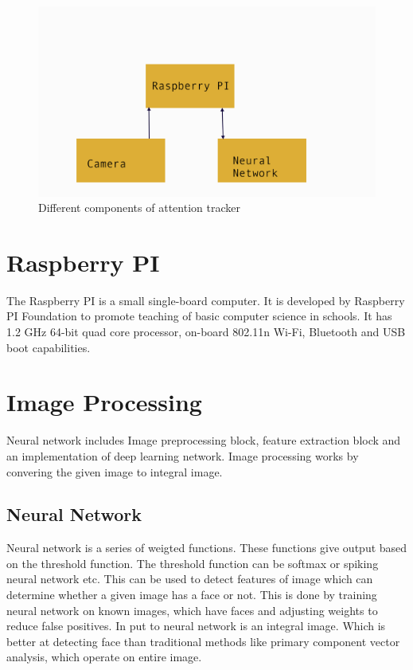 \begin{figure}[ht]
\centering
\includegraphics[scale=0.7]{block}
\caption{Different components of attention tracker}
\end{figure}

\section{Raspberry PI}
The Raspberry PI is a small single-board computer. It is developed by Raspberry PI Foundation to promote teaching of basic computer science in schools. It has  1.2 GHz 64-bit quad core processor, on-board 802.11n Wi-Fi, Bluetooth and USB boot capabilities. 

\section{Image Processing}
Neural network includes Image preprocessing block, feature extraction block and an implementation of deep learning network. Image processing works by convering the given image to integral image.

\subsection{Neural Network}
Neural network is a series of weigted functions. These functions give output based on the threshold function. The threshold function can be softmax or spiking neural network etc.  This can be used to detect features
of image which can determine whether a given image has a face or not. This is done by
training neural network on known images, which have faces and adjusting weights to reduce false positives. In put to neural network is an integral image. Which is better
at detecting face than traditional methods like primary component vector analysis, which operate on entire image.
